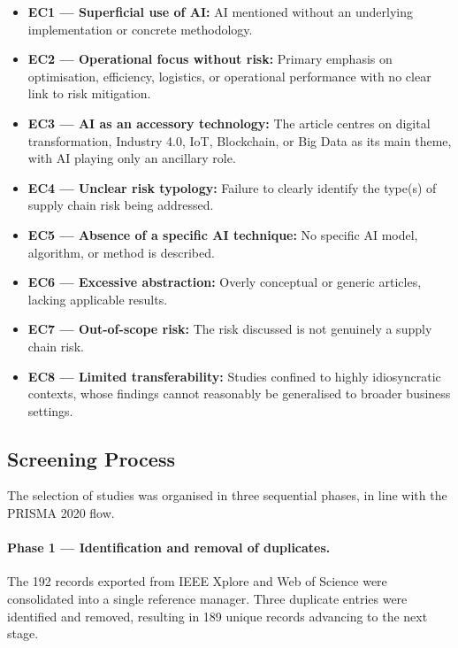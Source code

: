 \begin{itemize}
    \item \textbf{EC1 --- Superficial use of AI:} AI mentioned without an underlying implementation or concrete methodology.
    \item \textbf{EC2 --- Operational focus without risk:} Primary emphasis on optimisation, efficiency, logistics, or operational performance with no clear link to risk mitigation.
    \item \textbf{EC3 --- AI as an accessory technology:} The article centres on digital transformation, Industry 4.0, IoT, Blockchain, or Big Data as its main theme, with AI playing only an ancillary role.
    \item \textbf{EC4 --- Unclear risk typology:} Failure to clearly identify the type(s) of supply chain risk being addressed.
    \item \textbf{EC5 --- Absence of a specific AI technique:} No specific AI model, algorithm, or method is described.
    \item \textbf{EC6 --- Excessive abstraction:} Overly conceptual or generic articles, lacking applicable results.
    \item \textbf{EC7 --- Out-of-scope risk:} The risk discussed is not genuinely a supply chain risk.
    \item \textbf{EC8 --- Limited transferability:} Studies confined to highly idiosyncratic contexts, whose findings cannot reasonably be generalised to broader business settings.
\end{itemize}

\subsection{Screening Process}
\label{subsec:screening}

The selection of studies was organised in three sequential phases, in line with the PRISMA 2020 flow.

\paragraph{Phase 1 --- Identification and removal of duplicates.}
The 192 records exported from IEEE Xplore and Web of Science were consolidated into a single reference manager. Three duplicate entries were identified and removed, resulting in 189 unique records advancing to the next stage.

